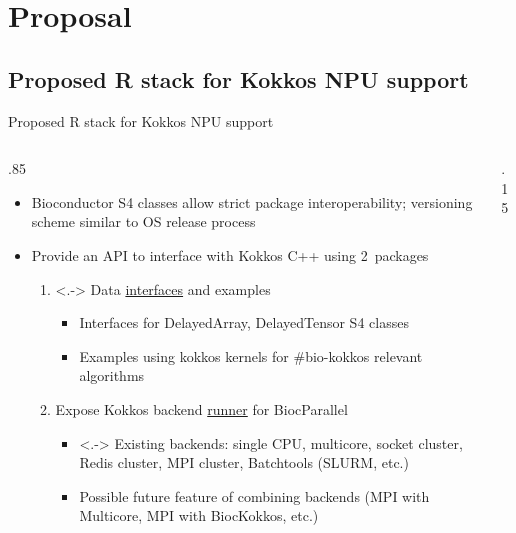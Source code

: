 \documentclass[
aspectratio=169,
xcolor={usenames}
]{beamer}
\begin{document}
\section{Proposal}

\subsection{Proposed R stack for Kokkos NPU support}
\begin{frame}{Proposed R stack for Kokkos NPU support}
  \begin{columns}[T]
    \begin{column}{.85\framewidth}
      \begin{itemize}[<+->]
      \item Bioconductor S4 classes %
        allow strict package interoperability; %
        versioning scheme similar to OS release process
      \item Provide an API to interface with Kokkos C++ using 2~packages
        \begin{enumerate}
        \item<.-> Data \ul{interfaces} and examples
          \begin{itemize}[<.->]
          \item Interfaces for DelayedArray, DelayedTensor S4 classes
          \item Examples using kokkos kernels %
            for \#bio-kokkos relevant algorithms
          \end{itemize}
        \item Expose Kokkos backend \ul{runner} for BiocParallel
          \begin{itemize}
          \item<.-> Existing backends: %
            single CPU, %
            multicore, %
            socket cluster, %
            Redis cluster, %
            MPI cluster, %
            Batchtools (SLURM, etc.)
          \item Possible future feature of combining backends %
            (MPI with Multicore, MPI with BiocKokkos, etc.)
          \end{itemize}
        \end{enumerate}
      \end{itemize}
    \end{column}
    \begin{column}{.15\framewidth}
      \begin{tikzpicture}[%
        every node/.style = {
          inner sep = 0pt,
          outer sep = 0pt
        }
        ]

\end{tikzpicture}
\end{column}
\end{columns}
\end{frame}
\end{document}
